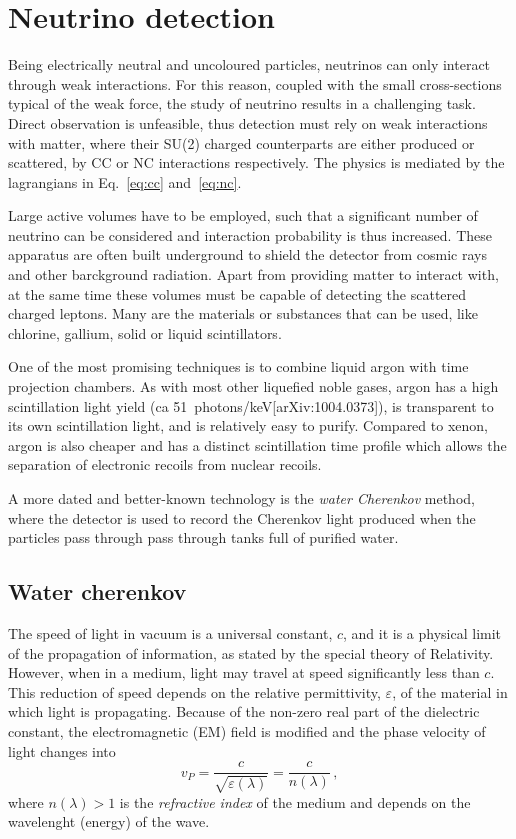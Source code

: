 \section{Neutrino detection}
\label{sec:detect}

Being electrically neutral and uncoloured particles, neutrinos can only interact through weak interactions.
For this reason, coupled with the small cross-sections typical of the weak force, the study of neutrino results %
in a challenging task.
Direct observation is unfeasible, thus detection must rely on weak interactions with matter, where %
their SU(2) charged counterparts are either produced or scattered, by CC or NC interactions respectively.
The physics is mediated by the lagrangians in Eq.~\ref{eq:cc} and~\ref{eq:nc}.

Large active volumes have to be employed, such that a significant number of neutrino can be considered and %
interaction probability is thus increased.
These apparatus are often built underground to shield the detector from cosmic rays and other barckground radiation.
Apart from providing matter to interact with, at the same time these volumes must be capable of detecting %
the scattered charged leptons.
Many are the materials or substances that can be used, like chlorine, gallium, solid or liquid scintillators.

One of the most promising techniques is to combine liquid argon with time projection chambers.
As with most other liquefied noble gases, argon has a high scintillation light yield %
(ca 51~photons/keV[arXiv:1004.0373]), is transparent to its own scintillation light, and is relatively easy to purify.
Compared to xenon, argon is also cheaper and has a distinct scintillation time profile which allows the separation %
of electronic recoils from nuclear recoils.

A more dated and better-known technology is the \emph{water Cherenkov} method, where the detector is used to %
record the Cherenkov light produced when the particles pass through pass through tanks full of purified water. 

\subsection{Water cherenkov}
\label{sec:wch}

The speed of light in vacuum is a universal constant, $c$, and it is a physical limit of the propagation %
of information, as stated by the special theory of Relativity.
However, when in a medium, light may travel at speed significantly less than $c$.
This reduction of speed depends on the relative permittivity, $\varepsilon$, of the material in which light is %
propagating.
Because of the non-zero real part of the dielectric constant, the electromagnetic (EM) field is modified and %
the phase velocity of light changes into
\begin{equation}
	\label{eq:light}
	v_P = \frac{c}{\sqrt{\varepsilon(\lambda)}} = \frac{c}{n(\lambda)}\,,
\end{equation}
where $n(\lambda) > 1$ is the \emph{refractive index} of the medium and %
depends on the wavelenght (energy) of the wave.

